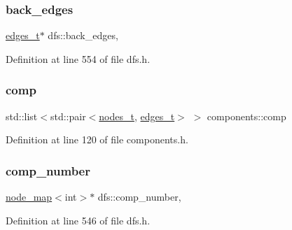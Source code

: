 \subsubsection{\texorpdfstring{back\+\_\+edges}{back\_edges}}
{\footnotesize\ttfamily \mbox{\hyperlink{edge_8h_a8f9587479bda6cf612c103494b3858e3}{edges\+\_\+t}}$\ast$ dfs\+::back\+\_\+edges\hspace{0.3cm}{\ttfamily [protected]}, {\ttfamily [inherited]}}



Definition at line 554 of file dfs.\+h.

\mbox{\label{classcomponents_a99483a9e5f031e6e6e2e5b0c47c2979e}} 
\subsubsection{\texorpdfstring{comp}{comp}}
{\footnotesize\ttfamily std\+::list$<$std\+::pair$<$\mbox{\hyperlink{edge_8h_a22ac17689106ba21a84e7bc54d1199d6}{nodes\+\_\+t}}, \mbox{\hyperlink{edge_8h_a8f9587479bda6cf612c103494b3858e3}{edges\+\_\+t}}$>$ $>$ components\+::comp\hspace{0.3cm}{\ttfamily [protected]}}



Definition at line 120 of file components.\+h.

\mbox{\label{classdfs_a00db016ac7eab69045cae408008890c1}} 
\subsubsection{\texorpdfstring{comp\+\_\+number}{comp\_number}}
{\footnotesize\ttfamily \mbox{\hyperlink{classnode__map}{node\+\_\+map}}$<$int$>$$\ast$ dfs\+::comp\+\_\+number\hspace{0.3cm}{\ttfamily [protected]}, {\ttfamily [inherited]}}



Definition at line 546 of file dfs.\+h.

\mbox{\label{classdfs_a99727f2274d6af63daae4f0518f3adbe}} 
